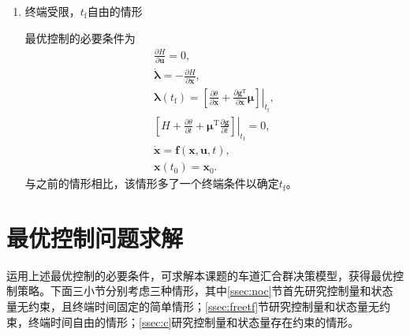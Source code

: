 \begin{enumerate}[wide=\parindent]
\item {\heiti 终端受限，$t_\mathrm{f}$自由的情形}

最优控制的必要条件为
\begin{gather}
\frac{\partial H}{\partial\bm{u}}=0,\label{eq:cn:control}\\
\dot{\bm{\lambda}}=-\frac{\partial H}{\partial\bm{x}},\label{eq:cn:company}\\
\bm{\lambda}(t_\mathrm{f})=\left. \left[\frac{\partial \theta}{\partial \bm{x}}+\frac{\partial \bm{g}^\mathrm{T}}{\partial \bm{x}}\bm{\mu}\right]\right|_{t_\mathrm{f}},\label{eq:cn:final}\\
\left. \left[H+\frac{\partial\theta}{\partial t}+\bm{\mu}^\mathrm{T}\frac{\partial\bm{g}}{\partial t}\right]\right|_{t_\mathrm{f}}=0,\label{eq:cn:final2}\\
\dot{\bm{x}}=\bm{f}(\bm{x},\bm{u},t),\\
\bm{x}(t_0)=\bm{x}_0.\label{eq:cn:last}
\end{gather}
与之前的情形相比，该情形多了一个终端条件以确定$t_\mathrm{f}$。
\end{enumerate}

\section{最优控制问题求解}
\label{sec:solve}
运用上述最优控制的必要条件，可求解本课题的车道汇合群决策模型，获得最优控制策略。下面三小节分别考虑三种情形，其中\ref{ssec:noc}节首先研究控制量和状态量无约束，且终端时间固定的简单情形；\ref{ssec:freetf}节研究控制量和状态量无约束，终端时间自由的情形；\ref{ssec:c}研究控制量和状态量存在约束的情形。

